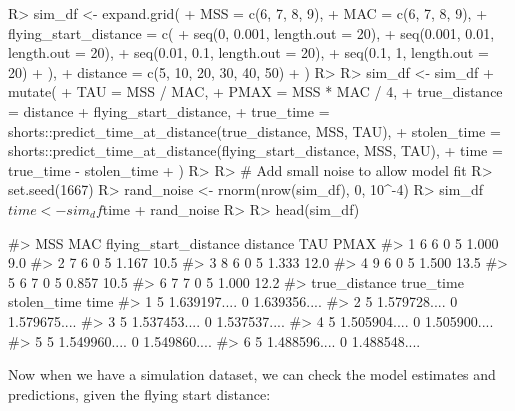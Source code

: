 \documentclass[
]{jss}
\begin{document}
\begin{CodeChunk}
\begin{CodeInput}
R> sim_df <- expand.grid(
+   MSS = c(6, 7, 8, 9),
+   MAC = c(6, 7, 8, 9),
+   flying_start_distance = c(
+     seq(0, 0.001, length.out = 20),
+     seq(0.001, 0.01, length.out = 20),
+     seq(0.01, 0.1, length.out = 20),
+     seq(0.1, 1, length.out = 20)
+   ),
+   distance = c(5, 10, 20, 30, 40, 50)
+ )
R> 
R> sim_df <- sim_df %
+   mutate(
+     TAU = MSS / MAC,
+     PMAX = MSS * MAC / 4,
+     true_distance = distance + flying_start_distance,
+     true_time = shorts::predict_time_at_distance(true_distance, MSS, TAU),
+     stolen_time = shorts::predict_time_at_distance(flying_start_distance, MSS, TAU),
+     time = true_time - stolen_time
+   )
R> 
R> # Add small noise to allow model fit
R> set.seed(1667)
R> rand_noise <- rnorm(nrow(sim_df), 0, 10^-4)
R> sim_df$time <- sim_df$time + rand_noise
R> 
R> head(sim_df)
\end{CodeInput}
\begin{CodeOutput}
#>   MSS MAC flying_start_distance distance   TAU PMAX
#> 1   6   6                     0        5 1.000  9.0
#> 2   7   6                     0        5 1.167 10.5
#> 3   8   6                     0        5 1.333 12.0
#> 4   9   6                     0        5 1.500 13.5
#> 5   6   7                     0        5 0.857 10.5
#> 6   7   7                     0        5 1.000 12.2
#>   true_distance    true_time stolen_time         time
#> 1             5 1.639197....           0 1.639356....
#> 2             5 1.579728....           0 1.579675....
#> 3             5 1.537453....           0 1.537537....
#> 4             5 1.505904....           0 1.505900....
#> 5             5 1.549960....           0 1.549860....
#> 6             5 1.488596....           0 1.488548....
\end{CodeOutput}
\end{CodeChunk}

Now when we have a simulation dataset, we can check the model estimates and predictions, given the flying start distance:

\begin{CodeChunk}
\end{CodeChunk}
\end{document}
